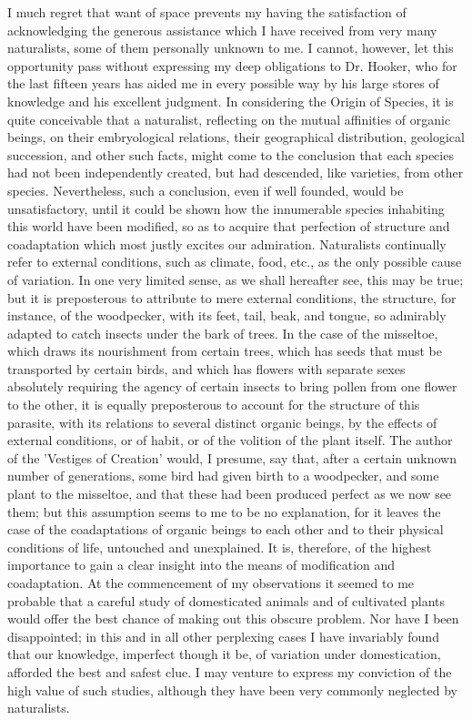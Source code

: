 I much regret that want of space prevents my having the satisfaction of acknowledging the generous assistance which I have received from very many naturalists, some of them personally unknown to me. I cannot, however, let this opportunity pass without expressing my deep obligations to Dr. Hooker, who for the last fifteen years has aided me in every possible way by his large stores of knowledge and his excellent judgment.
In considering the Origin of Species, it is quite conceivable that a naturalist, reflecting on the mutual affinities of organic beings, on their embryological relations, their geographical distribution, geological succession, and other such facts, might come to the conclusion that each species had not been independently created, but had descended, like varieties, from other species. Nevertheless, such a conclusion, even if well founded, would be unsatisfactory, until it could be shown how the innumerable species inhabiting this world have been modified, so as to acquire that perfection of structure and coadaptation which most justly excites our admiration. Naturalists continually refer to external conditions, such as climate, food, etc., as the only possible cause of variation. In one very limited sense, as we shall hereafter see, this may be true; but it is preposterous to attribute to mere external conditions, the structure, for instance, of the woodpecker, with its feet, tail, beak, and tongue, so admirably adapted to catch insects under the bark of trees. In the case of the misseltoe, which draws its nourishment from certain trees, which has seeds that must be transported by certain birds, and which has flowers with separate sexes absolutely requiring the agency of certain insects to bring pollen from one flower to the other, it is equally preposterous to account for the structure of this parasite, with its relations to several distinct organic beings, by the effects of external conditions, or of habit, or of the volition of the plant itself.
The author of the 'Vestiges of Creation' would, I presume, say that, after a certain unknown number of generations, some bird had given birth to a woodpecker, and some plant to the misseltoe, and that these had been produced perfect as we now see them; but this assumption seems to me to be no explanation, for it leaves the case of the coadaptations of organic beings to each other and to their physical conditions of life, untouched and unexplained.
It is, therefore, of the highest importance to gain a clear insight into the means of modification and coadaptation. At the commencement of my observations it seemed to me probable that a careful study of domesticated animals and of cultivated plants would offer the best chance of making out this obscure problem. Nor have I been disappointed; in this and in all other perplexing cases I have invariably found that our knowledge, imperfect though it be, of variation under domestication, afforded the best and safest clue. I may venture to express my conviction of the high value of such studies, although they have been very commonly neglected by naturalists.
